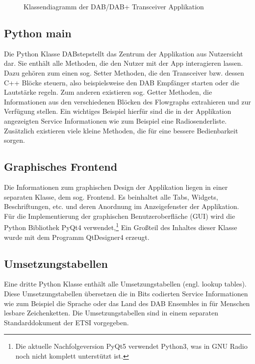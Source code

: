 \begin{figure}[b!]
\begin{center}
\begin{tikzpicture}[node distance=1cm]
\end{tikzpicture}
\end{center}
\caption{Klassendiagramm der DAB/DAB+ Transceiver Applikation}
\label{fig:class_diagramm}
\end{figure}

\subsection{Python main}
Die Python Klasse \dq DABstep\dq stellt das Zentrum der Applikation aus Nutzersicht dar. Sie enthält alle Methoden, die den Nutzer mit der App interagieren lassen. Dazu gehören zum einen sog. Setter Methoden, die den Transceiver bzw. dessen C++ Blöcke steuern, also beispielsweise den DAB Empfänger starten oder die Lautstärke regeln. Zum anderen existieren sog. Getter Methoden, die Informationen aus den verschiedenen Blöcken des Flowgraphs extrahieren und zur Verfügung stellen. Ein wichtiges Beispiel hierfür sind die in der Applikation angezeigten Service Informationen wie zum Beispiel eine Radiosenderliste. Zusätzlich existieren viele kleine Methoden, die für eine bessere Bedienbarkeit sorgen.

\subsection{Graphisches Frontend}
Die Informationen zum graphischen Design der Applikation liegen in einer separaten Klasse, dem sog. Frontend. Es beinhaltet alle Tabs, Widgets, Beschriftungen, etc. und deren Anordnung im Anzeigefenster der Applikation. Für die Implementierung der graphischen Benutzeroberfläche (GUI) wird die Python Bibliothek PyQt4 verwendet,\footnote{Die aktuelle Nachfolgeversion PyQt5 verwendet Python3, was in GNU Radio noch nicht komplett unterstützt ist.} Ein Großteil des Inhaltes dieser Klasse wurde mit dem Programm QtDesigner4 erzeugt.

\subsection{Umsetzungstabellen}
Eine dritte Python Klasse enthält alle Umsetzungstabellen (engl. lookup tables). Diese Umsetzungstabellen übersetzen die in Bits codierten Service Informationen wie zum Beispiel die Sprache oder das Land des DAB Ensembles in für Menschen lesbare Zeichenketten. Die Umsetzungstabellen sind in einem separaten Standarddokument der ETSI \cite{etsi:registered_tables} vorgegeben.

